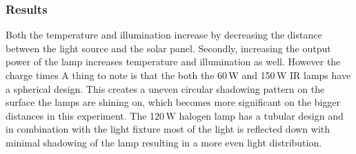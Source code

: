 \subsubsection{Results}

Both the temperature and illumination increase by decreasing the distance between the light source and the solar panel. 
Secondly, increasing the output power of the lamp increases temperature and illumination as well. 
However the charge times 
A thing to note is that the both the 60\,W and 150\,W IR lamps have a spherical design. This creates a uneven circular shadowing pattern on the surface the lamps are shining on, which becomes more significant on the bigger distances in this experiment.
The 120\,W halogen lamp has a tubular design and in combination with the light fixture most of the light is reflected down with minimal shadowing of the lamp resulting in a more even light distribution.

